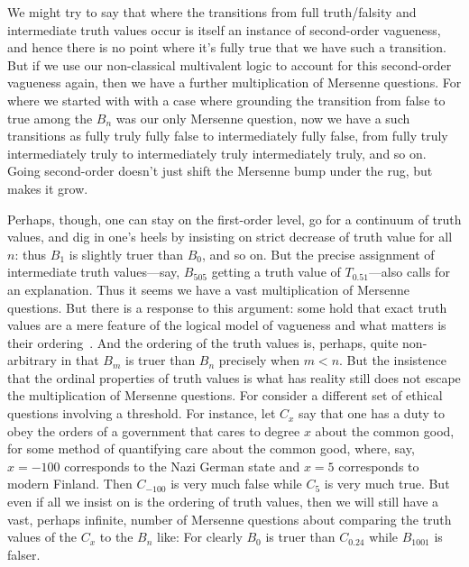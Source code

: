 We might try to say that where the transitions from full truth/falsity and intermediate truth values occur 
is itself an instance of second-order vagueness, and hence there is no point where it's fully true that we have
such a transition. But if we use our non-classical multivalent logic to account for this second-order vagueness
again, then we have a further multiplication of Mersenne questions. For where we started with with a case where
grounding the transition from false to true among the $B_n$ was our only Mersenne question, now we have a
such transitions as fully truly fully false to intermediately fully false, from fully truly intermediately
truly to intermediately truly intermediately truly, and so on. Going second-order doesn't just shift the 
Mersenne bump under the rug, but makes it grow.

Perhaps, though, one can stay on the first-order level, go for a continuum of truth values, and dig in one's heels 
by insisting on strict decrease of truth value for all $n$: thus $B_1$ is slightly truer than $B_0$, and so on. 
But the precise assignment of 
intermediate truth values---say, $B_{505}$ getting a truth value of $T_{0.51}$---also calls for an explanation. Thus it seems we have a vast multiplication
of Mersenne questions. But there is a response to this argument: some hold that exact truth values are a mere 
feature of the logical model of vagueness and what matters is their ordering~\parencite[p.~132]{WilliamsonVagueness}. And
the ordering of the truth values is, perhaps, quite non-arbitrary in that $B_{m}$ is truer than $B_n$ precisely when $m<n$. But the insistence that the ordinal
properties of truth values is what has reality still does not escape the multiplication of Mersenne questions. For consider a different set of ethical
questions involving a threshold. For instance, let $C_x$ say that one has a duty to obey the orders of a government that cares to degree $x$ about the common
good, for some method of quantifying care about the common good, where, say, $x=-100$ corresponds to the Nazi German state and $x=5$ corresponds to modern
Finland. Then $C_{-100}$ is very much false while $C_{5}$ is very much true. But even if all we insist on is the ordering of truth values, then we will still have a vast,
perhaps infinite, number of Mersenne  questions about comparing the truth values of the $C_x$ to the $B_n$ like: 
For clearly $B_0$ is truer than $C_{0.24}$ while $B_{1001}$ is falser.

